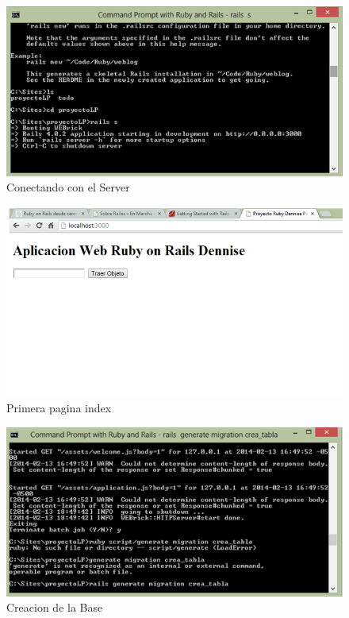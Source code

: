\begin{figure}
\centering
\includegraphics[scale=0.8]{imagenes/rails1.png}
\caption{Conectando con el Server}
\label{fig: threadsVsSync}
\end{figure}

\begin{figure}
\centering
\includegraphics[scale=0.8]{imagenes/rails2.png}
\caption{Primera pagina index}
\label{fig: threadsVsSync}
\end{figure}


\begin{figure}
\centering
\includegraphics[scale=0.8]{imagenes/rails4.png}
\caption{Creacion de la Base}
\label{fig: threadsVsSync}
\end{figure}

